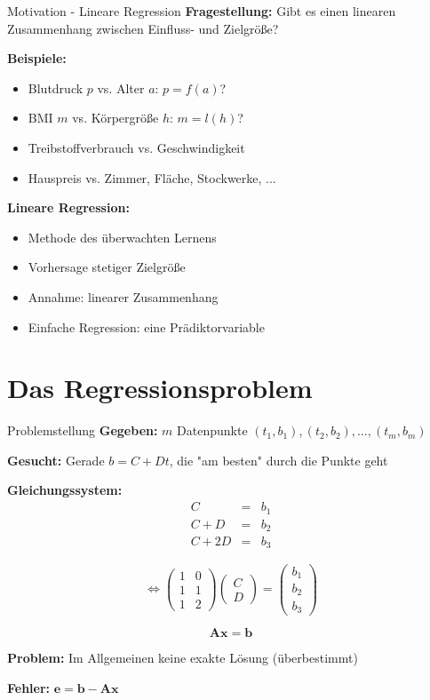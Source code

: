 \documentclass[a4paper, fontsize=7pt]{scrartcl}
\begin{document}
\begin{mainbox}{Motivation - Lineare Regression}
\textbf{Fragestellung:} Gibt es einen linearen Zusammenhang zwischen Einfluss- und Zielgröße?

\textbf{Beispiele:}
\begin{itemize}
    \item Blutdruck $p$ vs. Alter $a$: $p = f(a)$?
    \item BMI $m$ vs. Körpergröße $h$: $m = l(h)$?
    \item Treibstoffverbrauch vs. Geschwindigkeit
    \item Hauspreis vs. Zimmer, Fläche, Stockwerke, ...
\end{itemize}

\textbf{Lineare Regression:}
\begin{itemize}
    \item Methode des überwachten Lernens
    \item Vorhersage stetiger Zielgröße
    \item Annahme: linearer Zusammenhang
    \item Einfache Regression: eine Prädiktorvariable
\end{itemize}
\end{mainbox}

\section{Das Regressionsproblem}

\begin{mainbox}{Problemstellung}
\textbf{Gegeben:} $m$ Datenpunkte $(t_1, b_1), (t_2, b_2), \ldots, (t_m, b_m)$

\textbf{Gesucht:} Gerade $b = C + Dt$, die "am besten" durch die Punkte geht

\textbf{Gleichungssystem:}
\[
\begin{array}{rcl}
C &=& b_1 \\
C + D &=& b_2 \\
C + 2D &=& b_3
\end{array}
\]

\[
\Leftrightarrow \begin{pmatrix} 1 & 0 \\ 1 & 1 \\ 1 & 2 \end{pmatrix}
\begin{pmatrix} C \\ D \end{pmatrix} =
\begin{pmatrix} b_1 \\ b_2 \\ b_3 \end{pmatrix}
\]

\[\mathbf{Ax} = \mathbf{b}\]

\textbf{Problem:} Im Allgemeinen keine exakte Lösung (überbestimmt)

\textbf{Fehler:} $\mathbf{e} = \mathbf{b} - \mathbf{Ax}$
\end{mainbox}
\end{document}
